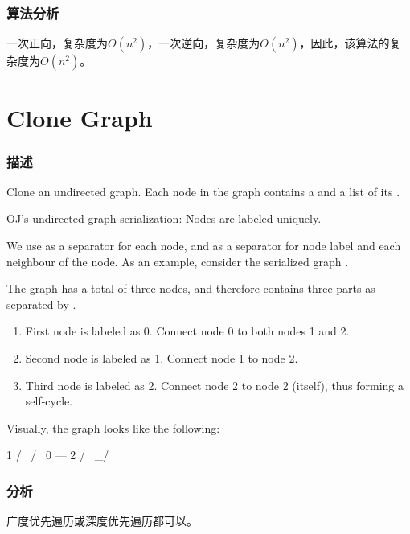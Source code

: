\subsubsection{算法分析}
一次正向，复杂度为$O(n^2)$，一次逆向，复杂度为$O(n^2)$，因此，该算法的复杂度为$O(n^2)$。


\section{Clone Graph} %
\label{sec:clone-graph}


\subsubsection{描述}
Clone an undirected graph. Each node in the graph contains a  and a list of its .


OJ's undirected graph serialization:
Nodes are labeled uniquely.

We use \code{\#} as a separator for each node, and \code{,} as a separator for node label and each neighbour of the node.
As an example, consider the serialized graph .

The graph has a total of three nodes, and therefore contains three parts as separated by \code{\#}.
\begin{enumerate}
	\item First node is labeled as 0. Connect node 0 to both nodes 1 and 2.
	\item Second node is labeled as 1. Connect node 1 to node 2.
	\item Third node is labeled as 2. Connect node 2 to node 2 (itself), thus forming a self-cycle.
\end{enumerate}

Visually, the graph looks like the following:
\begin{Code}
	1
	/ \
	/   \
	0 --- 2
	/ \
	\_/
\end{Code}


\subsubsection{分析}
广度优先遍历或深度优先遍历都可以。


